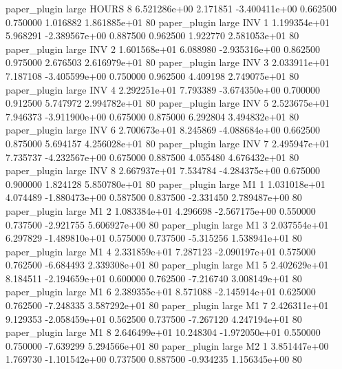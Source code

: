        paper_plugin      large    HOURS                 8 6.521286e+00      2.171851 -3.400411e+00 0.662500 0.750000       1.016882 1.861885e+01 80
       paper_plugin      large      INV                 1 1.199354e+01      5.968291 -2.389567e+00 0.887500 0.962500       1.922770 2.581053e+01 80
       paper_plugin      large      INV                 2 1.601568e+01      6.088980 -2.935316e+00 0.862500 0.975000       2.676503 2.616979e+01 80
       paper_plugin      large      INV                 3 2.033911e+01      7.187108 -3.405599e+00 0.750000 0.962500       4.409198 2.749075e+01 80
       paper_plugin      large      INV                 4 2.292251e+01      7.793389 -3.674350e+00 0.700000 0.912500       5.747972 2.994782e+01 80
       paper_plugin      large      INV                 5 2.523675e+01      7.946373 -3.911900e+00 0.675000 0.875000       6.292804 3.494832e+01 80
       paper_plugin      large      INV                 6 2.700673e+01      8.245869 -4.088684e+00 0.662500 0.875000       5.694157 4.256028e+01 80
       paper_plugin      large      INV                 7 2.495947e+01      7.735737 -4.232567e+00 0.675000 0.887500       4.055480 4.676432e+01 80
       paper_plugin      large      INV                 8 2.667937e+01      7.534784 -4.284375e+00 0.675000 0.900000       1.824128 5.850780e+01 80
       paper_plugin      large       M1                 1 1.031018e+01      4.074489 -1.880473e+00 0.587500 0.837500      -2.331450 2.789487e+00 80
       paper_plugin      large       M1                 2 1.083384e+01      4.296698 -2.567175e+00 0.550000 0.737500      -2.921755 5.606927e+00 80
       paper_plugin      large       M1                 3 2.037554e+01      6.297829 -1.489810e+01 0.575000 0.737500      -5.315256 1.538941e+01 80
       paper_plugin      large       M1                 4 2.331859e+01      7.287123 -2.090197e+01 0.575000 0.762500      -6.684493 2.339308e+01 80
       paper_plugin      large       M1                 5 2.402629e+01      8.184511 -2.194659e+01 0.600000 0.762500      -7.216740 3.008149e+01 80
       paper_plugin      large       M1                 6 2.389355e+01      8.571088 -2.145914e+01 0.625000 0.762500      -7.248335 3.587292e+01 80
       paper_plugin      large       M1                 7 2.426311e+01      9.129353 -2.058459e+01 0.562500 0.737500      -7.267120 4.247194e+01 80
       paper_plugin      large       M1                 8 2.646499e+01     10.248304 -1.972050e+01 0.550000 0.750000      -7.639299 5.294566e+01 80
       paper_plugin      large       M2                 1 3.851447e+00      1.769730 -1.101542e+00 0.737500 0.887500      -0.934235 1.156345e+00 80
